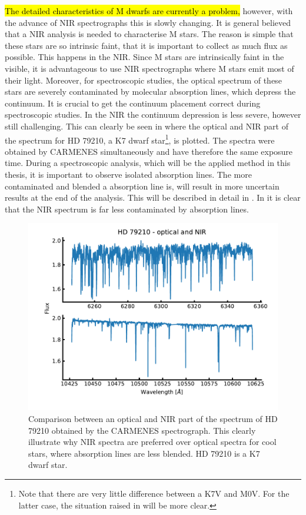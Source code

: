 \hl{The detailed characteristics of M dwarfs are currently a problem,} however, with the advance of
NIR spectrographs this is slowly changing. It is general believed that a NIR analysis is needed to
characterise M stars. The reason is simple that these stars are so intrinsic faint, that it is
important to collect as much flux as possible. This happens in the NIR. Since M stars are
intrinsically faint in the visible, it is advantageous to use NIR spectrographs where M stars emit
most of their light. Moreover, for spectroscopic studies, the optical spectrum of these stars are
severely contaminated by molecular absorption lines, which depress the continuum. It is crucial to
get the continuum placement correct during spectroscopic studies. In the NIR the continuum
depression is less severe, however still challenging. This can clearly be seen in
 where the optical and NIR part of the spectrum for HD 79210, a K7 dwarf
star\footnote{Note that there are very little difference between a K7V and M0V. For the latter case,
the situation raised in  will be more clear.}, is plotted. The spectra were
obtained by CARMENES simultaneously and have therefore the same exposure time. During a
spectroscopic analysis, which will be the applied method in this thesis, it is important to observe
isolated absorption lines. The more contaminated and blended a absorption line is, will result in
more uncertain results at the end of the analysis. This will be described in detail in
. In  it is clear that the NIR spectrum is far less
contaminated by absorption lines.

\begin{figure}[htpb!]
    \centering
    \includegraphics[width=1.0\linewidth]{figures/opticalVSnir.pdf}
    \caption{Comparison between an optical and NIR part of the spectrum of HD 79210 obtained by
             the CARMENES spectrograph. This clearly illustrate why NIR spectra are preferred over
             optical spectra for cool stars, where absorption lines are less blended. HD 79210 is a
             K7 dwarf star.}
    \label{fig:opticalVSnir}
\end{figure}

